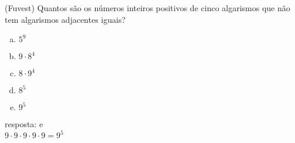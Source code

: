 \begin{ex}
 (Fuvest) Quantos são os números inteiros positivos de cinco algarismos que não tem algarismos adjacentes iguais?
    \begin{enumerate}[(a)]
    \item $5 ^ 9$
    \item $9\cdot 8 ^4$
    \item $8\cdot9^4$
    \item $8^5$
    \item $9^5$
    \end{enumerate}
      \begin{sol}
        resposta: e \\
        $9\cdot9\cdot9\cdot9\cdot9=9^5$
      \end{sol}
\end{ex}